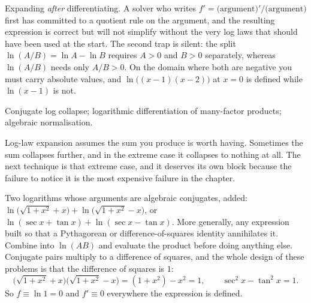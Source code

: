 \begin{trap}
Expanding \emph{after} differentiating. A solver who writes $f'=\bigl(\text{argument}\bigr)'/\bigl(\text{argument}\bigr)$ first has committed to a quotient rule on the argument, and the resulting expression is correct but will not simplify without the very log laws that should have been used at the start. The second trap is silent: the split $\ln(A/B)=\ln A-\ln B$ requires $A>0$ and $B>0$ separately, whereas $\ln(A/B)$ needs only $A/B>0$. On the domain where both are negative you must carry absolute values, and $\ln\bigl((x-1)(x-2)\bigr)$ at $x=0$ is defined while $\ln(x-1)$ is not.
\end{trap}

\begin{seealsob}Conjugate log collapse; logarithmic differentiation of many-factor products; algebraic normalisation.\end{seealsob}

Log-law expansion assumes the sum you produce is worth having. Sometimes the sum collapses further, and in the extreme case it collapses to nothing at all. The next technique is that extreme case, and it deserves its own block because the failure to notice it is the most expensive failure in the chapter.

\cue Two logarithms whose arguments are algebraic conjugates, added: $\ln\bigl(\sqrt{1+x^{2}}+x\bigr)+\ln\bigl(\sqrt{1+x^{2}}-x\bigr)$, or $\ln(\sec x+\tan x)+\ln(\sec x-\tan x)$. More generally, any expression built so that a Pythagorean or difference-of-squares identity annihilates it.
\method Combine into $\ln(AB)$ and evaluate the product before doing anything else. Conjugate pairs multiply to a difference of squares, and the whole design of these problems is that the difference of squares is $1$:
\[
\bigl(\sqrt{1+x^{2}}+x\bigr)\bigl(\sqrt{1+x^{2}}-x\bigr)=(1+x^{2})-x^{2}=1,\qquad \sec^{2}x-\tan^{2}x=1 .
\]
So $f\equiv\ln 1=0$ and $f'\equiv0$ everywhere the expression is defined.

